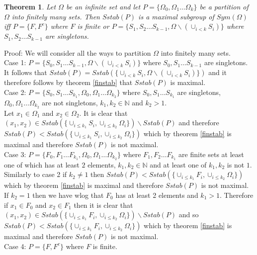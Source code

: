 \documentclass{report}
\newtheorem{theorem}{Theorem}[section]
\begin{document}
\begin{theorem}
Let $\Omega$ be an infinite set and let $P=\{\Omega_0, \Omega_1 \ldots \Omega_k\}$ be a partition of $\Omega$ into finitely many sets. Then $Sstab(P)$ is a maximal subgroup of $Sym(\Omega)$ iff $P=\{F, F^c\}$ where $F$ is finite or $P=\{S_1,S_2 \ldots S_{k-1}, \Omega \backslash (\cup_{i<k}S_i)\}$ where $S_1,S_2 \ldots S_{k-1}$ are singletons.
\end{theorem}\par
Proof: We will consider all the ways to partition $\Omega$ into finitely many sets.\\
Case 1: $P=\{S_0,S_1 \ldots S_{k-1}, \Omega \backslash (\cup_{i<k}S_i)\}$ where $S_0,S_1 \ldots S_{k-1}$ are singletons.\\
It follows that $Sstab(P)=Sstab(\{\cup_{i<k}S_i,\Omega \backslash (\cup_{i<k}S_i)\})$ and it therefore follows by theorem \ref{finstab} that $Sstab(P)$ is maximal.\\
Case 2: $P=\{S_0,S_1 \ldots S_{k_1}, \Omega_0, \Omega_1 \ldots \Omega_{k_2}\}$ where $S_0,S_1 \ldots S_{k_1}$ are singletons, $\Omega_0,\Omega_1 \ldots \Omega_{k_2}$ are not singletons, $k_1,k_2 \in \mathbb{N}$ and $k_2>1$.\\
Let $x_1 \in \Omega_1$ and $x_2 \in \Omega_2$. It is clear that $(x_1, x_2) \in Sstab(\{\cup_{i\leq k_1}S_i, \cup_{i\leq k_2}\Omega_i\} )\backslash Sstab(P)$ and therefore  $Sstab(P) < Sstab(\{\cup_{i\leq k_1}S_i, \cup_{i\leq k_2}\Omega_i\} )$ which by theorem \ref{finstab} is maximal and therefore $Sstab(P)$ is not maximal.\\
Case 3: $P=\{F_0,F_1 \ldots F_{k_1},\Omega_0, \Omega_1 \ldots \Omega_{k_2}\}$ where $F_1,F_2 \ldots F_{k_1}$ are finite sets at least one of which has at least $2$ elements, $k_1,k_2 \in \mathbb{N}$ and at least one of $k_1,k_2$ is not $1$.\\
Similarly to case 2 if $k_2 \neq 1$ then  $Sstab(P) < Sstab(\{\cup_{i\leq k_1}F_i, \cup_{i\leq k_2}\Omega_i\} )$ which by theorem \ref{finstab} is maximal and therefore $Sstab(P)$ is not maximal. If $k_2 = 1$ then we have wlog that $F_0$ has at least 2 elements and $k_1>1$. Therefore if $x_1 \in F_0$ and $x_2 \in F_1$ then it is clear that $(x_1, x_2) \in Sstab(\{\cup_{i\leq k_1}F_i, \cup_{i\leq k_2}\Omega_i\} )\backslash Sstab(P)$ and so $Sstab(P) < Sstab(\{\cup_{i\leq k_1}F_i, \cup_{i\leq k_2}\Omega_i\} )$ which by theorem \ref{finstab} is maximal and therefore $Sstab(P)$ is not maximal.\\
Case 4: $P=\{F,F^c\}$ where $F$ is finite.\\
\end{document}

